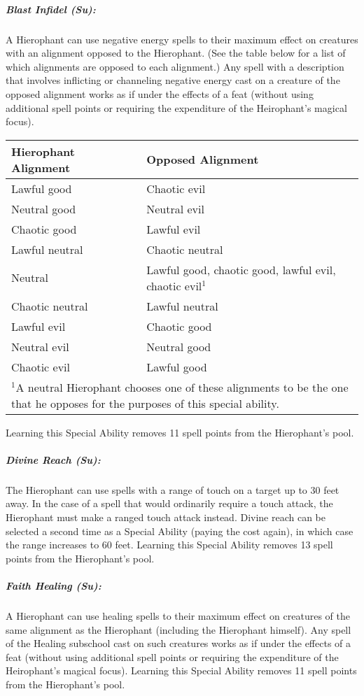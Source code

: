 \subparagraph{Blast Infidel (Su):}
A Hierophant can use negative energy spells to their maximum effect on creatures with an alignment opposed to the Hierophant. (See the table below for a list of which alignments are opposed to each alignment.) 
Any spell with a description that involves inflicting or channeling negative energy cast on a creature of the opposed alignment works as if under the effects of a  feat (without using additional spell points or requiring the expenditure of the Heirophant's magical focus).
\begin{center}
\begin{tabular}{|p{3cm}|p{3.4cm}|}
\hline
\textbf{Hierophant Alignment}&\textbf{Opposed Alignment}\\
\hline
Lawful good&		Chaotic evil\\
Neutral good&		Neutral evil\\
Chaotic good&		Lawful evil\\
Lawful neutral&		Chaotic neutral\\
Neutral&		Lawful good, chaotic good, lawful evil, chaotic evil$^1$\\
Chaotic neutral&	Lawful neutral\\
Lawful evil&		Chaotic good\\
Neutral evil&		Neutral good\\
Chaotic evil&		Lawful good\\
\hline
\multicolumn{2}{p{6.4cm}}{\scriptsize $^1$A neutral Hierophant chooses one of these alignments to be the one that he opposes for the purposes of this special ability.}
\end{tabular}
\end{center}
Learning this Special Ability removes 11 spell points from the Hierophant's pool.

\subparagraph{Divine Reach (Su):}
The Hierophant can use spells with a range of touch on a target up to 30 feet away. 
In the case of a spell that would ordinarily require a touch attack, the Hierophant must make a ranged touch attack instead.
Divine reach can be selected a second time as a Special Ability (paying the cost again), in which case the range increases to 60 feet. 
Learning this Special Ability removes 13 spell points from the Hierophant's pool.

\subparagraph{Faith Healing (Su):}
A Hierophant can use healing spells to their maximum effect on creatures of the same alignment as the Hierophant (including the Hierophant himself). 
Any spell of the Healing subschool cast on such creatures works as if under the effects of a  feat (without using additional spell points or requiring the expenditure of the Heirophant's magical focus).
Learning this Special Ability removes 11 spell points from the Hierophant's pool.

